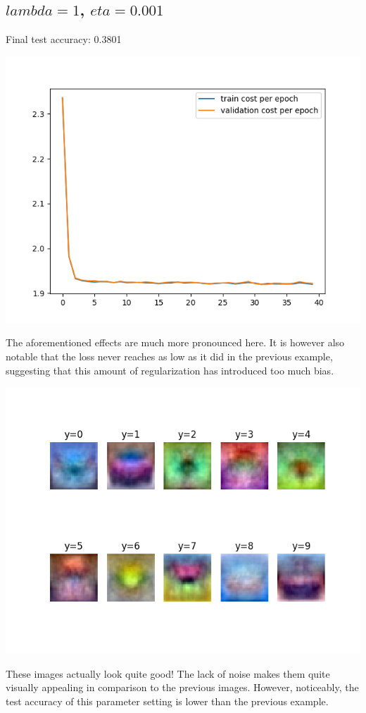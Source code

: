 \documentclass[11pt,a4paper]{article}
\begin{document}
\subsection{$lambda=1$, $eta=0.001$}
Final test accuracy: 0.3801

\includegraphics[width=\textwidth]{lambda_1.png}

The aforementioned effects are much more pronounced here. It is however also notable that the loss never reaches as low as it did in the previous example, suggesting that this amount of regularization has introduced too much bias.

\includegraphics[width=\textwidth]{lambda_1_montage.png}

These images actually look quite good! The lack of noise makes them quite visually appealing in comparison to the previous images. However, noticeably, the test accuracy of this parameter setting is lower than the previous example.
\end{document}
